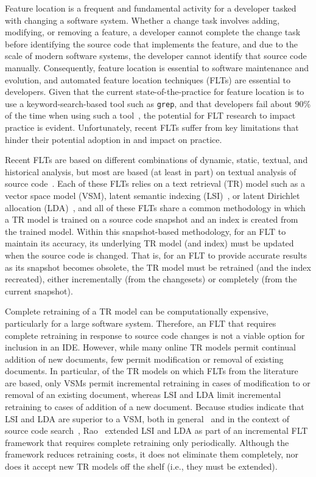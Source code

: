 
Feature location is a frequent and fundamental activity for a developer tasked with changing a software system.
Whether a change task involves adding, modifying, or removing a feature, a developer cannot complete the change task before identifying the source code that implements the feature, and due to the scale of modern software systems, the developer cannot identify that source code manually.
Consequently, feature location is essential to software maintenance and evolution, and automated feature location techniques (FLTs) are essential to developers.
Given that the current state-of-the-practice for feature location is to use a keyword-search-based tool such as \texttt{grep}, and that developers fail about 90\% of the time when using such a tool~\cite{Ko-etal:2006}, the potential for FLT research to impact practice is evident.
Unfortunately, recent FLTs suffer from key limitations that hinder their potential adoption in and impact on practice.

Recent FLTs are based on different combinations of dynamic, static, textual, and historical analysis, but most are based (at least in part) on textual analysis of source code~\cite{Dit-etal:11}.
Each of these FLTs relies on a text retrieval (TR) model such as a vector space model (VSM), latent semantic indexing (LSI)~\cite{Deerwester-etal:1990}, or latent Dirichlet allocation (LDA)~\cite{Blei-etal:03}, and all of these FLTs share a common methodology in which a TR model is trained on a source code snapshot and an index is created from the trained model.
Within this snapshot-based methodology, for an FLT to maintain its accuracy, its underlying TR model (and index) must be updated when the source code is changed.
That is, for an FLT to provide accurate results as its snapshot becomes obsolete, the TR model must be retrained (and the index recreated), either incrementally (from the changesets) or completely (from the current snapshot).

Complete retraining of a TR model can be computationally expensive, particularly for a large software system.
Therefore, an FLT that requires complete retraining in response to source code changes is not a viable option for inclusion in an IDE.
However, while many online TR models permit continual addition of new documents, few permit modification or removal of existing documents.
In particular, of the TR models on which FLTs from the literature are based, only VSMs permit incremental retraining in cases of modification to or removal of an existing document,
whereas LSI and LDA limit incremental retraining to cases of addition of a new document.
Because studies indicate that LSI and LDA are superior to a VSM, both in general~\cite{} and in the context of source code search~\cite{},
Rao~\cite{Rao:2013} extended LSI and LDA as part of an incremental FLT framework that requires complete retraining only periodically.
Although the framework reduces retraining costs, it does not eliminate them completely, nor does it accept new TR models off the shelf (i.e., they must be extended).

